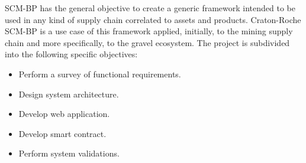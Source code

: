 
\acresetall 

\ac{SCM-BP} has the general objective to create a generic framework intended to be used in any kind of supply chain correlated to assets and products. Craton-Roche SCM-BP is a use case of this framework applied, initially, to the mining supply chain and more specifically, to the gravel ecosystem. The project is subdivided into the following specific objectives:
\begin{itemize}
\item Perform a survey of functional requirements.
\item Design system architecture.
\item Develop web application.
\item Develop smart contract.
\item Perform system validations.
\end{itemize}




%


